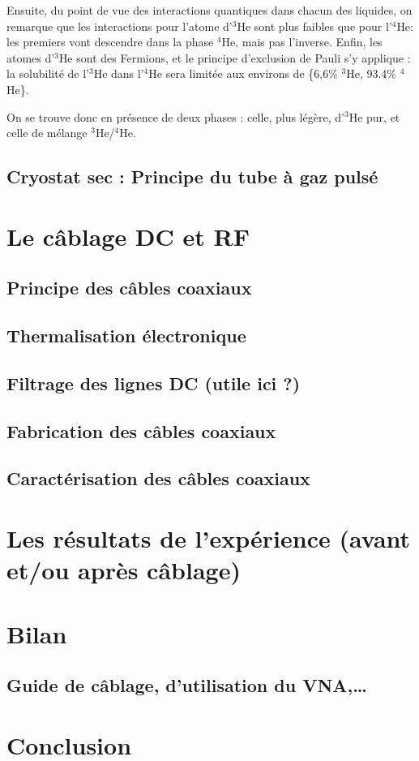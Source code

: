 \documentclass[a4paper,11pt]{report}
\newcommand{\HeT}{$^3$He\xspace}
\newcommand{\HeQ}{$^4$He\xspace}
\begin{document}
Ensuite, du point de vue des interactions quantiques dans chacun des liquides, on remarque que les interactions pour l'atome d'\HeT sont plus faibles que pour l'\HeQ : les premiers vont descendre dans la phase \HeQ, mais pas l'inverse.
\newline
Enfin, les atomes d'\HeT sont des Fermions, et le principe d'exclusion de Pauli s'y applique : la solubilité de l'\HeT dans l'\HeQ sera limitée aux environs de \{6,6\% \HeT, 93.4\% \HeQ\}.
\newline

On se trouve donc en présence de deux phases : celle, plus légère, d'\HeT pur, et celle de mélange \HeT/\HeQ.
\newline


\section{Cryostat sec : Principe du tube à gaz pulsé}


\chapter{Le câblage DC et RF}
\section{Principe des câbles coaxiaux}

\section{Thermalisation électronique}

\section{Filtrage des lignes DC (utile ici ?)}

\section{Fabrication des câbles coaxiaux}

\section{Caractérisation des câbles coaxiaux}


\chapter{Les résultats de l'expérience (avant et/ou après câblage)}

\chapter{Bilan}
\section{Guide de câblage, d'utilisation du VNA,…}
\chapter*{Conclusion}
%



\end{document}
